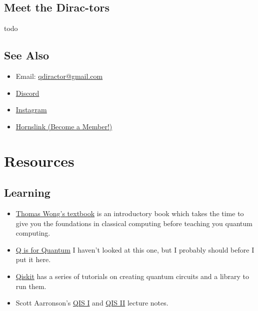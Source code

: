 \documentclass{article}
\begin{document}
	\subsection{Meet the Dirac-tors}

	todo

	\subsection{See Also}

	\begin{itemize}
		\item Email: \href{mailto:qdiractor@gmail.com}{qdiractor@gmail.com}
		\item \href{https://discord.gg/UBnRaHuzF9}{Discord}
		\item \href{https://www.instagram.com/texasquantum/?hl=en}{Instagram}
		\item \href{https://utexas.campuslabs.com/engage/organization/quantum-collective}{Hornslink (Become a Member!)}
	\end{itemize}

\section{Resources}

\subsection{Learning}
\begin{itemize}
	\item \href{https://www.thomaswong.net/introduction-to-classical-and-quantum-computing-1e3p.pdf}{Thomas Wong's textbook} is an introductory book which takes the time to give you the foundations in classical computing before teaching you quantum computing.

	\item \href{https://www.qisforquantum.org/}{Q is for Quantum} I haven't looked at this one, but I probably should before I put it here.
	
	\item \href{https://qiskit.org/}{Qiskit} has a series of tutorials on creating quantum circuits and a library to run them.

	\item Scott Aarronson's \href{https://www.scottaaronson.com/qclec.pdf}{QIS I} and \href{https://www.scottaaronson.com/qisii.pdf}{QIS II} lecture notes. 
\end{itemize}
\end{document}
